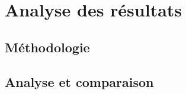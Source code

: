 \chapter{Analyse des résultats}

\section{Méthodologie}

\section{Analyse et comparaison}

\clearpage